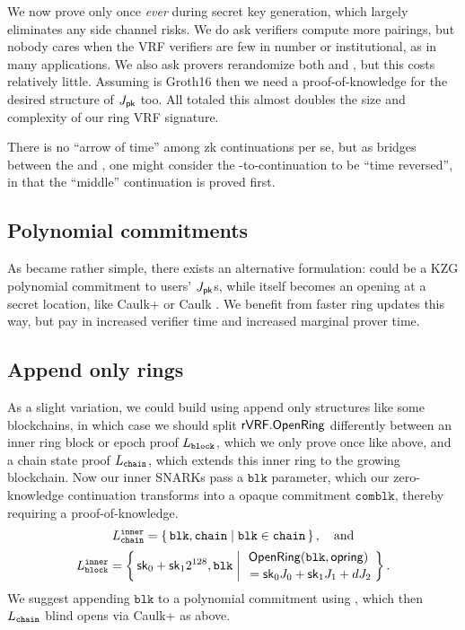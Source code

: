 We now prove \pisk only once {\it ever} during secret key generation,
which largely eliminates any side channel risks.
We do ask verifiers compute more pairings, but nobody cares when
the VRF verifiers are few in number or institutional,
as in many applications.
We also ask provers rerandomize both \pisk and \pipk, but this costs relatively little.
Assuming \pipk is Groth16 then we need a proof-of-knowledge for the desired structure of $J_\mathsf{pk}$ too.
All totaled this almost doubles the size and complexity of our ring VRF signature.

There is no ``arrow of time'' among zk continuations per se, but
as \pisk bridges between the \PedVRF and \pipk,
one might consider the \pisk-to-\pipk continuation to be ``time reversed'',
 in that the ``middle'' continuation is proved first.


\subsection{Polynomial commitments}
\label{subsec:rvrf_caulk}

As \pipk became rather simple, %
there exists an alternative formulation:  
\comring could be a KZG polynomial commitment \cite{KZG} to users' $J_\mathsf{pk}$s,
while \pipk itself becomes an opening at a secret location, like
Caulk+ \cite{caulk+} or Caulk \cite{caulk}.
We benefit from faster ring updates this way, but pay in
 increased verifier time and increased marginal prover time.


\subsection{Append only rings}

\newcommand\pichain{\ensuremath{\pi_{\mathtt{chain}}}\xspace}

As a slight variation,
we could build \ring using append only structures like some blockchains,
in which case we should split ${\mathsf{rVRF}}.{\mathsf{OpenRing}}$ differently between
an inner ring block or epoch proof $L_{\mathtt{block}}$,
 which we only prove once like \pisk above, and
a chain state proof $L_{\mathtt{chain}}$,
 which extends this inner ring to the growing blockchain.
Now our inner SNARKs pass a $\mathtt{blk}$ parameter, which 
our zero-knowledge continuation transforms into a opaque commitment
$\mathtt{comblk}$, thereby requiring a proof-of-knowledge.
%
$$ \baseL_{\mathtt{chain}}^\inner = \Setst{ \mathtt{blk}, \mathtt{chain} }{
	\mathtt{blk} \in \mathtt{chain}
} \mathcomma \quad\textrm{and} $$ 
%
$$ \baseL_{\mathtt{block}}^\inner = \Setst{ \sk_0 + \sk_1 2^{128}, \mathtt{blk} }{
	\eprint{\exists d,\openring \textrm{\ s.t.\ }}{}
	\genfrac{}{}{0pt}{}{ \OpenRing(\mathtt{blk},\openring) }{ \,\, = \sk_0 \genJ_0 + \sk_1 \genJ_1 + d \genJ_2 }
} \mathperiod $$  
%
We suggest appending $\mathtt{blk}$ to a polynomial commitment using
\cite{aSVC}, which then $L_{\mathtt{chain}}$ blind opens
via Caulk+ \cite{caulk+} as above.


